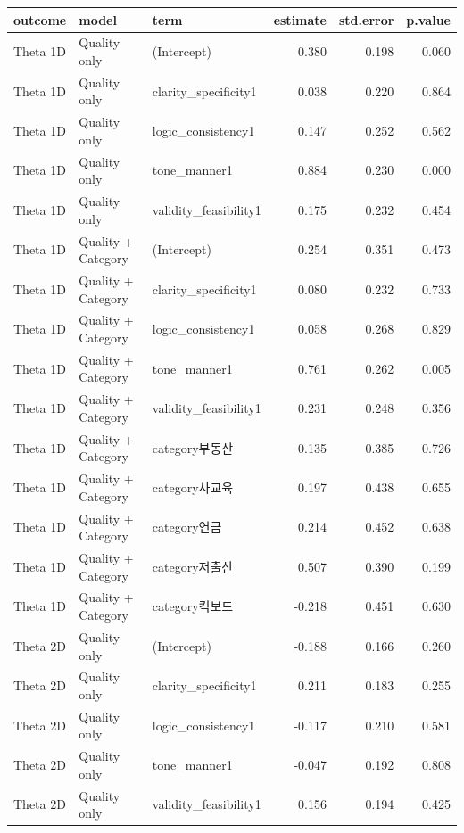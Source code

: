 \begin{tabular}{lllrrr}
  \toprule
outcome & model & term & estimate & std.error & p.value \\ 
  \midrule
Theta 1D & Quality only & (Intercept) & 0.380 & 0.198 & 0.060 \\ 
  Theta 1D & Quality only & clarity\_specificity1 & 0.038 & 0.220 & 0.864 \\ 
  Theta 1D & Quality only & logic\_consistency1 & 0.147 & 0.252 & 0.562 \\ 
  Theta 1D & Quality only & tone\_manner1 & 0.884 & 0.230 & 0.000 \\ 
  Theta 1D & Quality only & validity\_feasibility1 & 0.175 & 0.232 & 0.454 \\ 
  Theta 1D & Quality + Category & (Intercept) & 0.254 & 0.351 & 0.473 \\ 
  Theta 1D & Quality + Category & clarity\_specificity1 & 0.080 & 0.232 & 0.733 \\ 
  Theta 1D & Quality + Category & logic\_consistency1 & 0.058 & 0.268 & 0.829 \\ 
  Theta 1D & Quality + Category & tone\_manner1 & 0.761 & 0.262 & 0.005 \\ 
  Theta 1D & Quality + Category & validity\_feasibility1 & 0.231 & 0.248 & 0.356 \\ 
  Theta 1D & Quality + Category & category부동산 & 0.135 & 0.385 & 0.726 \\ 
  Theta 1D & Quality + Category & category사교육 & 0.197 & 0.438 & 0.655 \\ 
  Theta 1D & Quality + Category & category연금 & 0.214 & 0.452 & 0.638 \\ 
  Theta 1D & Quality + Category & category저출산 & 0.507 & 0.390 & 0.199 \\ 
  Theta 1D & Quality + Category & category킥보드 & -0.218 & 0.451 & 0.630 \\ 
  Theta 2D & Quality only & (Intercept) & -0.188 & 0.166 & 0.260 \\ 
  Theta 2D & Quality only & clarity\_specificity1 & 0.211 & 0.183 & 0.255 \\ 
  Theta 2D & Quality only & logic\_consistency1 & -0.117 & 0.210 & 0.581 \\ 
  Theta 2D & Quality only & tone\_manner1 & -0.047 & 0.192 & 0.808 \\ 
  Theta 2D & Quality only & validity\_feasibility1 & 0.156 & 0.194 & 0.425 \\ 

\end{tabular}
